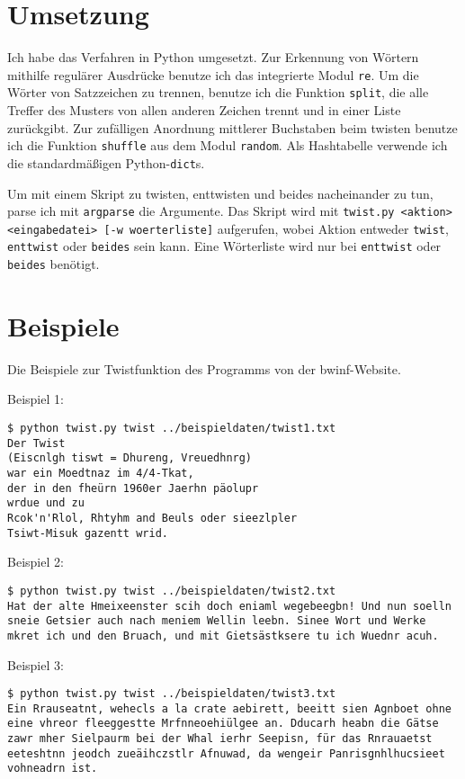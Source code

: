 \documentclass[a4paper,10pt,ngerman]{scrartcl}
\begin{document}
\section{Umsetzung}
Ich habe das Verfahren in Python umgesetzt. Zur Erkennung von Wörtern mithilfe regulärer Ausdrücke benutze ich das integrierte Modul \texttt{re}. Um die Wörter von Satzzeichen zu trennen, benutze ich die Funktion \texttt{split}, die alle Treffer des Musters von allen anderen Zeichen trennt und in einer Liste zurückgibt. Zur zufälligen Anordnung mittlerer Buchstaben beim twisten benutze ich die Funktion \texttt{shuffle} aus dem Modul \texttt{random}. Als Hashtabelle verwende ich die standardmäßigen Python-\texttt{dict}s. 

Um mit einem Skript zu twisten, enttwisten und beides nacheinander zu tun, parse ich mit \texttt{argparse} die Argumente. Das Skript wird mit \texttt{twist.py <aktion> <eingabedatei> [-w woerterliste]} aufgerufen, wobei Aktion entweder \texttt{twist}, \texttt{enttwist} oder \texttt{beides} sein kann. Eine Wörterliste wird nur bei \texttt{enttwist} oder \texttt{beides} benötigt.

\section{Beispiele}
Die Beispiele zur Twistfunktion des Programms von der bwinf-Website.

\vspace{10pt}
Beispiel 1:
\begin{lstlisting}
$ python twist.py twist ../beispieldaten/twist1.txt 
Der Twist  
(Eiscnlgh tiswt = Dhureng, Vreuedhnrg)  
war ein Moedtnaz im 4/4-Tkat,  
der in den fheürn 1960er Jaerhn päolupr  
wrdue und zu  
Rcok'n'Rlol, Rhtyhm and Beuls oder sieezlpler 
Tsiwt-Misuk gazentt wrid.
\end{lstlisting}

\vspace{10pt}
Beispiel 2:
\begin{lstlisting}[breaklines=true]
  $ python twist.py twist ../beispieldaten/twist2.txt 
Hat der alte Hmeixeenster scih doch eniaml wegebeegbn! Und nun soelln sneie Getsier auch nach meniem Wellin leebn. Sinee Wort und Werke mkret ich und den Bruach, und mit Gietsästksere tu ich Wuednr acuh.
\end{lstlisting}

\vspace{10pt}
Beispiel 3:
\begin{lstlisting}[breaklines=true]
$ python twist.py twist ../beispieldaten/twist3.txt 
Ein Rrauseatnt, wehecls a la crate aebirett, beeitt sien Agnboet ohne eine vhreor fleeggestte Mrfnneoehiülgee an. Dducarh heabn die Gätse zawr mher Sielpaurm bei der Whal ierhr Seepisn, für das Rnrauaetst eeteshtnn jeodch zueäihczstlr Afnuwad, da wengeir Panrisgnhlhucsieet vohneadrn ist.
\end{lstlisting}
\end{document}
